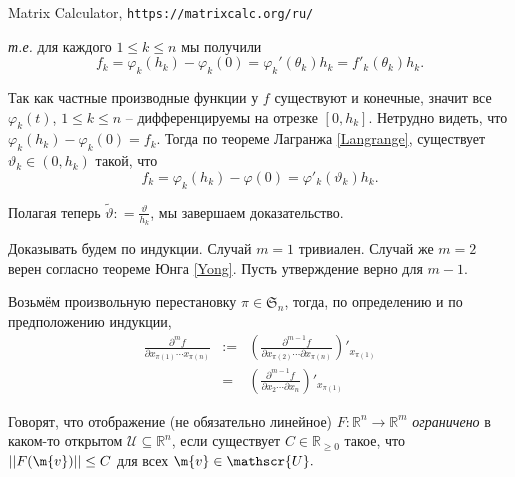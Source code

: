 \newpage
\begin{thebibliography}{BGLL}



\end{thebibliography}

\renewcommand{\refname}{Software and online repositories}
\begin{thebibliography}{OEIS}

 Matrix Calculator, \texttt{https://matrixcalc.org/ru/} 

\end{thebibliography}



\textit{т.е.} для каждого $1\le k \le n$ мы получили
\[
 f_k = \varphi_k(h_k) - \varphi_k(0) = \varphi_k'(\theta_k)h_k = f'_k(\theta_k)h_k. 
\]







Так как частные производные функции у $f$ существуют и конечные, значит все $\varphi_k(t)$, $1\le k \le n$ -- дифференцируемы на отрезке $[0,h_k]$. Нетрудно видеть, что $\varphi_k(h_k) - \varphi_k(0) = f_k.$ Тогда по теореме Лагранжа \ref{Langrange}, существует $\vartheta_k \in (0, h_k)$ такой, что 
\[
 f_k = \varphi_k(h_k) - \varphi(0) = \varphi'_k(\vartheta_k)h_k.
\]

Полагая теперь $\widetilde{\vartheta}: = \frac{\vartheta}{h_k}$, мы завершаем доказательство.







Доказывать будем по индукции. Случай $m =1$ тривиален. Случай же $m =2$ верен согласно теореме Юнга \ref{Yong}. Пусть утверждение верно для $m-1$.

Возьмём произвольную перестановку $\pi \in \mathfrak{S}_n$, тогда, по определению и по предположению индукции,
\begin{eqnarray*}
    \frac{\partial^m f}{\partial x_{\pi(1)} \cdots x_{\pi(n)}} &:=& \left(\frac{\partial^{m-1} f}{\partial x_{\pi(2)} \cdots \partial x_{\pi(n)}} \right)'_{x_{\pi(1)}} \\
    &=& \left(\frac{\partial^{m-1} f}{\partial x_{2} \cdots \partial x_{n}} \right)'_{x_{\pi(1)}}
\end{eqnarray*}



\begin{definition}
    Говорят, что отображение (не обязательно линейное) $F:\mathbb{R}^n \to \mathbb{R}^m$ \textit{ограничено} в каком-то открытом $\mathscr{U}\subseteq \mathbb{R}^n$, если существует $C\in \mathbb{R}_{\ge 0}$ такое, что $|| F(\m{v})|| \le C $ для всех $\m{v} \in \mathscr{U}.$
\end{definition}

